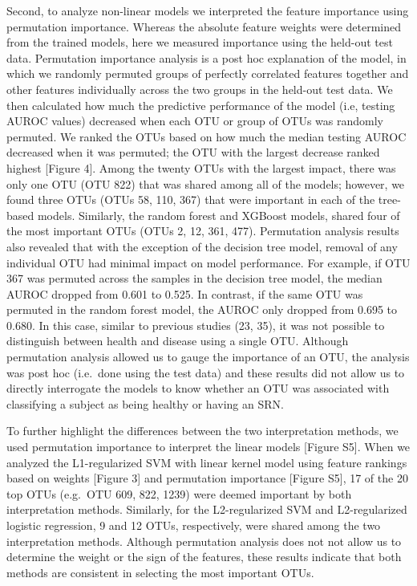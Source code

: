 \documentclass[11pt,]{article}
\begin{document}
Second, to analyze non-linear models we interpreted the feature
importance using permutation importance. Whereas the absolute feature
weights were determined from the trained models, here we measured
importance using the held-out test data. Permutation importance analysis
is a post hoc explanation of the model, in which we randomly permuted
groups of perfectly correlated features together and other features
individually across the two groups in the held-out test data. We then
calculated how much the predictive performance of the model (i.e,
testing AUROC values) decreased when each OTU or group of OTUs was
randomly permuted. We ranked the OTUs based on how much the median
testing AUROC decreased when it was permuted; the OTU with the largest
decrease ranked highest {[}Figure 4{]}. Among the twenty OTUs with the
largest impact, there was only one OTU (OTU 822) that was shared among
all of the models; however, we found three OTUs (OTUs 58, 110, 367) that
were important in each of the tree-based models. Similarly, the random
forest and XGBoost models, shared four of the most important OTUs (OTUs
2, 12, 361, 477). Permutation analysis results also revealed that with
the exception of the decision tree model, removal of any individual OTU
had minimal impact on model performance. For example, if OTU 367 was
permuted across the samples in the decision tree model, the median AUROC
dropped from 0.601 to 0.525. In contrast, if the same OTU was permuted
in the random forest model, the AUROC only dropped from 0.695 to 0.680.
In this case, similar to previous studies (23, 35), it was not possible
to distinguish between health and disease using a single OTU. Although
permutation analysis allowed us to gauge the importance of an OTU, the
analysis was post hoc (i.e.~done using the test data) and these results
did not allow us to directly interrogate the models to know whether an
OTU was associated with classifying a subject as being healthy or having
an SRN.

To further highlight the differences between the two interpretation
methods, we used permutation importance to interpret the linear models
{[}Figure S5{]}. When we analyzed the L1-regularized SVM with linear
kernel model using feature rankings based on weights {[}Figure 3{]} and
permutation importance {[}Figure S5{]}, 17 of the 20 top OTUs (e.g.~OTU
609, 822, 1239) were deemed important by both interpretation methods.
Similarly, for the L2-regularized SVM and L2-regularized logistic
regression, 9 and 12 OTUs, respectively, were shared among the two
interpretation methods. Although permutation analysis does not not allow
us to determine the weight or the sign of the features, these results
indicate that both methods are consistent in selecting the most
important OTUs.
\end{document}
